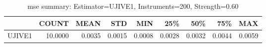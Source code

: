 \begin{table}[ht]
\centering
\caption{mse summary: Estimator=UJIVE1, Instruments=200, Strength=0.60}
\begin{tabular}{lrrrrrrrr}
\toprule
 & COUNT & MEAN & STD & MIN & 25\% & 50\% & 75\% & MAX \\
\midrule
UJIVE1 & 10.0000 & 0.0035 & 0.0015 & 0.0008 & 0.0028 & 0.0032 & 0.0044 & 0.0059 \\
\bottomrule
\end{tabular}
\end{table}
